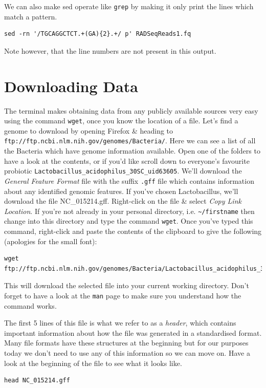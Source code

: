 \documentclass[a4paper,12pt,twoside]{memoir}
\begin{document}
\begin{steps}
We can also make sed operate like \texttt{grep} by making it only print the lines which match a pattern.
\begin{lstlisting}
sed -rn '/TGCAGGCTCT.+(GA){2}.+/ p' RADSeqReads1.fq
\end{lstlisting}
Note however, that the line numbers are not present in this output.
\end{steps}


\section{Downloading Data}

\begin{steps}
The terminal makes obtaining data from any publicly available sources very easy using the command \texttt{wget}, once you know the location of a file.
Let's find a genome to download by opening Firefox \& heading to \texttt{ftp://ftp.ncbi.nlm.nih.gov/genomes/Bacteria/}.
Here we can see a list of all the Bacteria which have genome information available.
Open one of the folders to have a look at the contents, or if you'd like scroll down to everyone's favourite probiotic \texttt{Lactobacillus_acidophilus_30SC_uid63605}.
We'll download the \textit{General Feature Format} file with the suffix \texttt{.gff} file which contains information about any identified genomic features.
If you've chosen Lactobacillus, we'll download the file NC_015214.gff.
Right-click on the file \& select \textit{Copy Link Location}.
If you're not already in your personal directory, i.e. \texttt{\~{}/firstname} then change into this directory and type the command \texttt{wget}.
Once you've typed this command, right-click and paste the contents of the clipboard to give the following (apologies for the small font):
\end{steps}

\begin{lstlisting}[basicstyle=\tiny]
wget ftp://ftp.ncbi.nlm.nih.gov/genomes/Bacteria/Lactobacillus_acidophilus_30SC_uid63605/NC_015214.gff
\end{lstlisting}

This will download the selected file into your current working directory.
Don't forget to have a look at the \texttt{man} page to make sure you understand how the command works.

\begin{steps}
The first 5 lines of this file is what we refer to as a \textit{header}, which contains important information about how the file was generated in a standardised format.
Many file formats have these structures at the beginning but for our purposes today we don't need to use any of this information so we can move on.
Have a look at the beginning of the file to see what it looks like.
\end{steps}
\begin{lstlisting}
head NC_015214.gff
\end{lstlisting}
\end{document}
